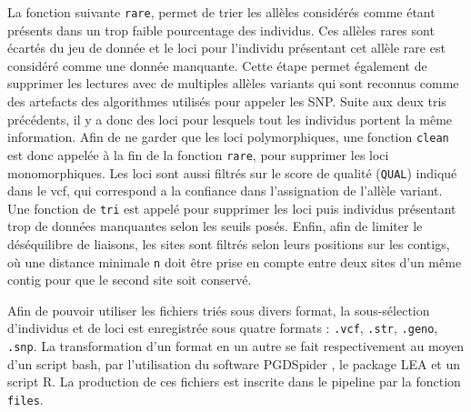 La fonction suivante \verb|rare|, permet de trier les allèles considérés comme étant présents dans un trop faible pourcentage des individus.
 Ces allèles rares sont écartés du jeu de donnée et le loci pour l'individu présentant cet allèle rare est considéré comme une donnée manquante.
 Cette étape permet également de supprimer les lectures avec de multiples allèles variants qui sont reconnus comme des artefacts des algorithmes utilisés pour appeler les SNP.
 Suite aux deux tris précédents, il y a donc des loci pour lesquels tout les individus portent la même information.
 Afin de ne garder que les loci polymorphiques, une fonction \verb|clean| est donc appelée à la fin de la fonction \verb|rare|, pour supprimer les loci monomorphiques.
Les loci sont aussi filtrés sur le score de qualité (\verb|QUAL|) indiqué dans le vcf, qui correspond a la confiance dans l'assignation de l'allèle variant.
 Une fonction de \verb|tri| est appelé pour supprimer les loci puis individus présentant trop de données manquantes selon les seuils posés.
 Enfin, afin de limiter le déséquilibre de liaisons, les sites sont filtrés selon leurs positions sur les contigs, où une distance minimale \verb|n| doit être prise en compte entre deux sites d'un même contig pour que le second site soit conservé.


Afin de pouvoir utiliser les fichiers triés sous divers format, la sous-sélection d'individus et de loci est enregistrée sous quatre formats : \verb|.vcf|, \verb|.str|, \verb|.geno|, \verb|.snp|.
 La transformation d'un format en un autre se fait respectivement au moyen d'un script bash, par l'utilisation du software PGDSpider \citep{Lischer2012}, le package LEA \citep{Frichot2015} et un script R.
 La production de ces fichiers est inscrite dans le pipeline par la fonction \verb|files|.

